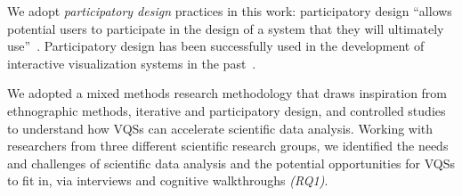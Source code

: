 \par We adopt {\em participatory design} practices in this work: participatory design ``allows potential users to 
 participate in the design of a system that they will ultimately use''~\cite{Gould1983,Muller1993}. Participatory design has been successfully used in the development of interactive visualization systems in the past~\cite{Aragon2008,Chuang2012}.  %
\par We adopted a mixed methods research methodology that draws inspiration from ethnographic methods, iterative and participatory design, and controlled studies~\cite{miller_salkind_miller_2002,shneiderman2006strategies,Muller1993} to understand how VQSs can accelerate scientific data analysis.  Working with researchers from three different scientific research groups, we identified the needs and challenges of scientific data analysis and the potential opportunities for VQSs to fit in, via interviews and cognitive walkthroughs {\em (RQ1)}. %
